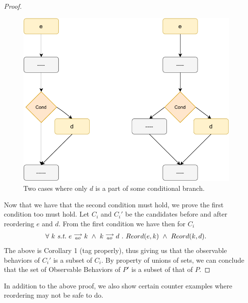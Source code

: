 \begin{proof}
\begin{itemize}
                    \begin{figure}[H]
                        \centering 
                        \includegraphics[scale=0.7]{InstructionReordering/ConditionalsProofFig3.pdf}
                        \caption{Two cases where only $d$ is a part of some conditional branch.}
                    \end{figure}

            \end{itemize}

            Now that we have that the second condition must hold, we prove the first condition too must hold. Let $C_i$ and $C_i'$ be the candidates before and after reordering $e$ and $d$. From the first condition we have then for $C_i$
            \begin{align*}
                \forall \ k \ \textit{s.t.} \ 
                \reln{e}{ao}{k} \ \wedge \ \reln{k}{ao}{d} \ . \ 
                Reord(e,k) \ \wedge \ Reord(k,d).
            \end{align*}
            The above is Corollary 1 (tag properly), thus giving us that the observable behaviors of $C_i'$ is a subset of $C_i$. By property of unions of sets, we can conclude that the set of Observable Behaviors of $P'$ is a subset of that of $P$.

        \end{proof}

        In addition to the above proof, we also show certain counter examples where reordering may not be safe to do. 

